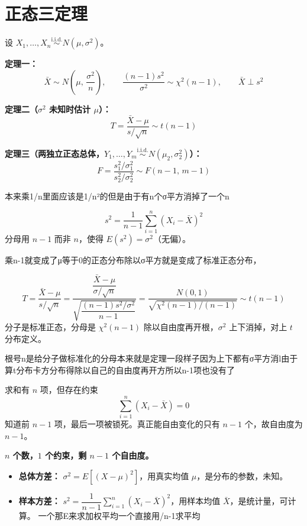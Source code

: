 \section{正态三定理}
\begin{note}[正态总体三大定理]
设 $X_1, \ldots, X_n \overset{\text{i.i.d.}}{\sim} N(\mu, \sigma^2)$。

\textbf{定理一：}
$$\bar{X} \sim N\!\left(\mu,\, \frac{\sigma^2}{n}\right), \qquad \frac{(n-1)s^2}{\sigma^2} \sim \chi^2(n-1), \qquad \bar{X} \perp s^2$$

\textbf{定理二（$\sigma^2$ 未知时估计 $\mu$）：}
$$T = \frac{\bar{X}-\mu}{s/\sqrt{n}} \sim t(n-1)$$

\textbf{定理三（两独立正态总体，$Y_1,\ldots,Y_m \overset{\text{i.i.d.}}{\sim} N(\mu_2,\sigma_2^2)$）：}
$$F = \frac{s_1^2/\sigma_1^2}{s_2^2/\sigma_2^2} \sim F(n-1,\, m-1)$$
\end{note}
\begin{dxtips}
    本来乘1/n里面应该是1/n²的但是由于有n个σ平方消掉了一个n
\end{dxtips}
\begin{definition}[样本方差]
$$s^2 = \frac{1}{n-1}\sum_{i=1}^n (X_i - \bar{X})^2$$
分母用 $n-1$ 而非 $n$，使得 $E(s^2) = \sigma^2$（无偏）。
\end{definition}
\begin{dxtips}
    乘n-1就变成了μ等于0的正态分布除以σ平方就是变成了标准正态分布，
\end{dxtips}
\begin{note}[定理二的推导]
$$T = \frac{\bar{X}-\mu}{s/\sqrt{n}} = \frac{\dfrac{\bar{X}-\mu}{\sigma/\sqrt{n}}}{\sqrt{\dfrac{(n-1)s^2/\sigma^2}{n-1}}} = \frac{N(0,1)}{\sqrt{\chi^2(n-1)/(n-1)}} \sim t(n-1)$$
分子是标准正态，分母是 $\chi^2(n-1)$ 除以自由度再开根，$\sigma^2$ 上下消掉，对上 $t$ 分布定义。
\end{note}
\begin{dxtips}
    根号n是给分子做标准化的分母本来就是定理一段样子因为上下都有σ平方消l由于算t分布卡方分布得除以自己的自由度再开方所以n-1项也没有了
\end{dxtips}
\begin{note}[为什么自由度是 $n-1$]
求和有 $n$ 项，但存在约束
$$\sum_{i=1}^n (X_i - \bar{X}) = 0$$
知道前 $n-1$ 项，最后一项被锁死。真正能自由变化的只有 $n-1$ 个，故自由度为 $n-1$。

\textbf{$n$ 个数，$1$ 个约束，剩 $n-1$ 个自由度。}
\end{note}
\begin{note}[总体方差与样本方差对比]

\begin{itemize}
  \item \textbf{总体方差：} $\sigma^2 = E[(X-\mu)^2]$，用真实均值 $\mu$，是分布的参数，未知。
  \item \textbf{样本方差：} $s^2 = \dfrac{1}{n-1}\displaystyle\sum_{i=1}^n(X_i-\bar{X})^2$，用样本均值 $\bar{X}$，是统计量，可计算。
  一个那E来求加权平均一个直接用/n-1求平均
\end{itemize}
\end{note}
